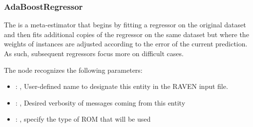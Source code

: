 \subsubsection{AdaBoostRegressor}
  The  is a meta-estimator that begins by fitting a regressor on
  the original dataset and then fits additional copies of the regressor on the same dataset
  but where the weights of instances are adjusted according to the error of the current
  prediction. As such, subsequent regressors focus more on difficult cases.

  The  node recognizes the following parameters:
    \begin{itemize}
      \item {}: , 
        User-defined name to designate this entity in the RAVEN input file.
      \item {}: , 
        Desired verbosity of messages coming from this entity
      \item {}: , 
        specify the type of ROM that will be used
  \end{itemize}

